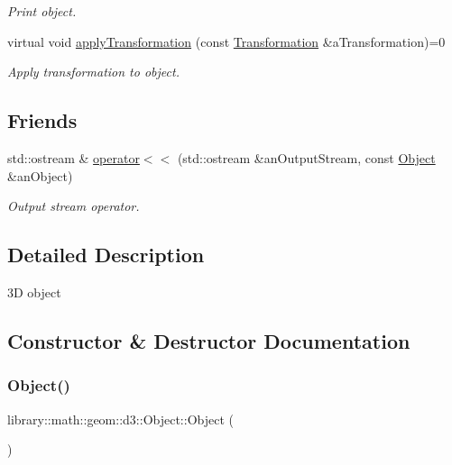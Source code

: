 \begin{DoxyCompactItemize}
\begin{DoxyCompactList}\small\item\em Print object. \end{DoxyCompactList}\item 
virtual void \hyperlink{classlibrary_1_1math_1_1geom_1_1d3_1_1_object_a5fc47b1ee5d9a28efc6010d3d1512470}{apply\+Transformation} (const \hyperlink{classlibrary_1_1math_1_1geom_1_1d3_1_1_transformation}{Transformation} \&a\+Transformation)=0
\begin{DoxyCompactList}\small\item\em Apply transformation to object. \end{DoxyCompactList}\end{DoxyCompactItemize}
\subsection*{Friends}
\begin{DoxyCompactItemize}
\item 
std\+::ostream \& \hyperlink{classlibrary_1_1math_1_1geom_1_1d3_1_1_object_a418df9bf4a73078f3d494edef1743f8d}{operator$<$$<$} (std\+::ostream \&an\+Output\+Stream, const \hyperlink{classlibrary_1_1math_1_1geom_1_1d3_1_1_object}{Object} \&an\+Object)
\begin{DoxyCompactList}\small\item\em Output stream operator. \end{DoxyCompactList}\end{DoxyCompactItemize}


\subsection{Detailed Description}
3D object 

\subsection{Constructor \& Destructor Documentation}
\mbox{\label{classlibrary_1_1math_1_1geom_1_1d3_1_1_object_ab484354bbce44290b6d288c7825d9e42}} 
\subsubsection{\texorpdfstring{Object()}{Object()}}
{\footnotesize\ttfamily library\+::math\+::geom\+::d3\+::\+Object\+::\+Object (\begin{DoxyParamCaption}{ }\end{DoxyParamCaption})\hspace{0.3cm}{\ttfamily [default]}}



